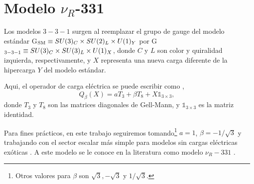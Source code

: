 \newpage
\section[\hspace{-0.14in}Modelo $\nu_R$-331]{Modelo $\nu_R$-331}


Los modelos $3-3-1$ surgen al reemplazar el grupo de gauge del modelo estándar G$_{\rm SM} \equiv SU(3)_C \times SU(2)_L \times U(1)_Y$ por G$_{\rm 3-3-1} \equiv SU(3)_C \times SU(3)_L \times U(1)_X$, donde $C$ y $L$ son color y quiralidad izquierda, respectivamente, y $X$ representa una nueva carga diferente de la hipercarga $Y$ del modelo estándar.

Aqui, el operador de carga eléctrica se puede escribir como \cite{Pleitez:2021abk},
\begin{equation}
Q_{\beta}(X) = a T_3 + \beta T_8 + X \mathds{1}_{3\times 3},
\end{equation}
donde $T_3$ y $T_8$ son las matrices diagonales de Gell-Mann, y $\mathds{1}_{3\times 3}$ es la matriz identidad. 

Para fines prácticos, en este trabajo seguiremos \cite{sanchez2019vacuum} tomando\footnote{Otros valores para $\beta$ son $\sqrt{3},-\sqrt{3}$ y $1/\sqrt{3}$.} $a=1$, $\beta = -1/\sqrt{3}$ y trabajando con el sector escalar más simple para modelos sin cargas eléctricas exóticas \cite{Foot:1994ym,Ponce:2001jn}. A este modelo se le conoce en la literatura como modelo $\nu_R-331$ \cite{Singer:1980sw}.

